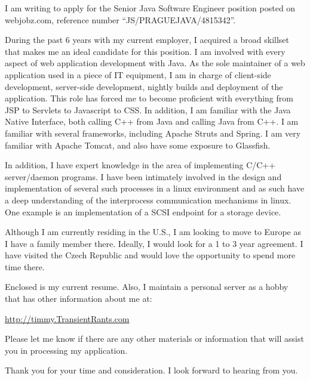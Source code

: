 \documentclass[10pt,stdletter,dateno]{newlfm}
\begin{document}
\begin{newlfm}

I am writing to apply for the Senior Java Software Engineer position posted on webjobz.com, reference number ``JS/PRAGUEJAVA/4815342''.

During the past 6 years with my current employer, I acquired a broad skillset 
that makes me an ideal candidate for this position.  I am involved with every aspect of web application 
development with Java.  As the sole maintainer of a web application used in a piece of IT equipment, I am 
in charge of client-side development, server-side development, nightly builds and deployment 
of the application.  This role has forced me to become proficient with everything from JSP to Servlets to Javascript to CSS.  
In addition, I am familiar with the Java Native Interface, both calling C++ from Java and calling Java from C++.  I am familiar with 
several frameworks, including Apache Struts and Spring.  I am very familiar with Apache Tomcat, and also have some exposure to Glassfish.

In addition, I have expert knowledge in the area of implementing C/C++ server/daemon programs.  I have been intimately involved 
in the design and implementation of several such processes in a linux environment and as such have a deep understanding of the 
interprocess communication mechanisms in linux.  One example is an implementation of a SCSI endpoint for a storage device.  

Although I am currently residing in the U.S., I am looking to move to Europe as I have a family member there.  
Ideally, I would look for a 1 to 3 year agreement.  I have visited the Czech Republic and would love the opportunity 
to spend more time there.

Enclosed is my current resume.  Also, I maintain a personal server as a hobby that has 
other information about me at:

\url{http://timmy.TransientRants.com}

Please let me know if there are any other materials or information that will assist you in processing my application.

Thank you for your time and consideration.  I look forward to hearing from you.

\end{newlfm}
\end{document}
